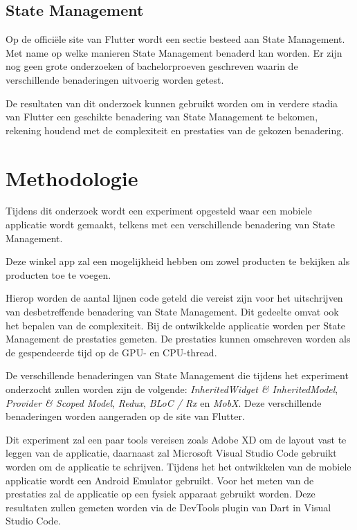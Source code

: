 
\subsection*{State Management}
Op de officiële site van Flutter wordt een sectie besteed aan State Management.
Met name op welke manieren State Management benaderd kan worden. Er zijn nog geen grote
onderzoeken of bachelorproeven geschreven waarin de verschillende benaderingen uitvoerig worden getest.

De resultaten van dit onderzoek kunnen gebruikt worden om in verdere stadia van Flutter
een geschikte benadering van State Management te bekomen, rekening houdend met de complexiteit en prestaties
van de gekozen benadering.


\section{Methodologie}
\label{sec:methodologie}
Tijdens dit onderzoek wordt een experiment opgesteld waar een mobiele applicatie wordt gemaakt, telkens met een verschillende benadering van State Management. 

Deze winkel app zal een mogelijkheid hebben om zowel producten te bekijken als producten toe te voegen.

Hierop worden de aantal lijnen code geteld die vereist zijn voor het uitschrijven van
desbetreffende benadering van State Management.
Dit gedeelte omvat ook het bepalen van de complexiteit.
Bij de ontwikkelde applicatie worden per State Management de prestaties gemeten.
De prestaties kunnen omschreven worden als de gespendeerde tijd op de GPU- en CPU-thread.

De verschillende benaderingen van State Management die tijdens het experiment onderzocht zullen worden zijn de volgende: \emph{InheritedWidget \& InheritedModel}, 
\emph{Provider \& Scoped Model}, \emph{Redux}, \emph{BLoC / Rx} en \emph{MobX}.
Deze verschillende benaderingen worden aangeraden op de site van Flutter.

Dit experiment zal een paar tools vereisen zoals Adobe XD om de layout vast te leggen van de applicatie,
daarnaast zal Microsoft Visual Studio Code gebruikt worden om de applicatie te schrijven.
Tijdens het het ontwikkelen van de mobiele applicatie wordt een Android Emulator gebruikt. Voor het meten van de prestaties zal de applicatie op een fysiek apparaat gebruikt worden. Deze resultaten zullen gemeten worden via de DevTools plugin van Dart in Visual Studio Code.

